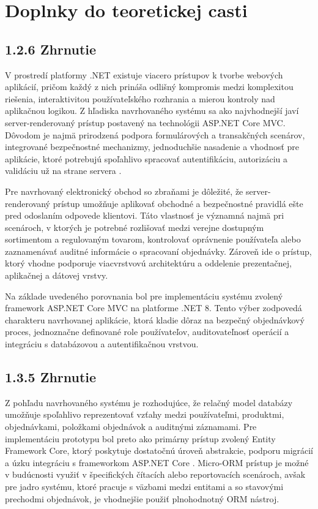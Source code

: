 
\section*{Doplnky do teoretickej casti}

\subsection*{1.2.6 Zhrnutie}
V prostredí platformy .NET existuje viacero prístupov k tvorbe webových aplikácií, pričom každý z nich prináša odlišný kompromis medzi komplexitou riešenia, interaktivitou používateľského rozhrania a mierou kontroly nad aplikačnou logikou. Z hľadiska navrhovaného systému sa ako najvhodnejší javí server-renderovaný prístup postavený na technológii ASP.NET Core MVC. Dôvodom je najmä prirodzená podpora formulárových a transakčných scenárov, integrované bezpečnostné mechanizmy, jednoduchšie nasadenie a vhodnosť pre aplikácie, ktoré potrebujú spoľahlivo spracovať autentifikáciu, autorizáciu a validáciu už na strane servera \cite{aspnetcore_overview}.

Pre navrhovaný elektronický obchod so zbraňami je dôležité, že server-renderovaný prístup umožňuje aplikovať obchodné a bezpečnostné pravidlá ešte pred odoslaním odpovede klientovi. Táto vlastnosť je významná najmä pri scenároch, v ktorých je potrebné rozlišovať medzi verejne dostupným sortimentom a regulovaným tovarom, kontrolovať oprávnenie používateľa alebo zaznamenávať auditné informácie o spracovaní objednávky. Zároveň ide o prístup, ktorý vhodne podporuje viacvrstvovú architektúru a oddelenie prezentačnej, aplikačnej a dátovej vrstvy.

Na základe uvedeného porovnania bol pre implementáciu systému zvolený framework ASP.NET Core MVC na platforme .NET 8. Tento výber zodpovedá charakteru navrhovanej aplikácie, ktorá kladie dôraz na bezpečný objednávkový proces, jednoznačne definované role používateľov, auditovateľnosť operácií a integráciu s databázovou a autentifikačnou vrstvou.

\subsection*{1.3.5 Zhrnutie}
Z pohľadu navrhovaného systému je rozhodujúce, že relačný model databázy umožňuje spoľahlivo reprezentovať vzťahy medzi používateľmi, produktmi, objednávkami, položkami objednávok a auditnými záznamami. Pre implementáciu prototypu bol preto ako primárny prístup zvolený Entity Framework Core, ktorý poskytuje dostatočnú úroveň abstrakcie, podporu migrácií a úzku integráciu s frameworkom ASP.NET Core \cite{efcore_overview}. Micro-ORM prístup je možné v budúcnosti využiť v špecifických čítacích alebo reportovacích scenároch, avšak pre jadro systému, ktoré pracuje s väzbami medzi entitami a so stavovými prechodmi objednávok, je vhodnejšie použiť plnohodnotný ORM nástroj.

